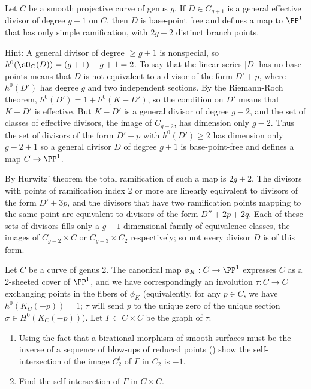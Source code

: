 \begin{exercise}[$g+1$ theorem]\label{g+1 theorem} 
Let $C$ be a smooth projective curve of genus $g$. If $D \in C_{g+1}$ is a general effective divisor of degree $g+1$ on $C$, then 
$D$ is base-point free and defines a  map to $\PP^1$ that has only simple ramification, with $2g+2$ distinct  branch points.

Hint: 
A general divisor of degree $\geq g+1$ is nonspecial, so $h^0(\sO_C(D)) = (g+1)-g+1 = 2$. To say that the linear series $|D|$ has no base points means that $D$ is not equivalent to a divisor of the form
$D'+p$, where $h^0(D')$ has degree $g$ and two independent sections. By the Riemann-Roch theorem, $h^0(D') = 1+h^0(K-D')$, so the condition on $D'$ means that $K-D'$ is effective. But $K-D'$ is a general divisor of degree $g-2$, and
the set of classes of effective divisors, the image of $C_{g-2}$, has dimension only $g-2$. 
Thus the set of divisors of the form $D'+p$ with $h^0(D') \geq 2$ has dimension only $g -2 +1$
so a general divisor $D$ of degree $g+1$ is base-point-free and defines a map $C\to \PP^1$. 

By Hurwitz' theorem the total ramification of such a map is $2g+2$. The divisors with points of ramification
index 2 or more are linearly equivalent to divisors of the form $D'+3p$, and the divisors that have two ramification
points mapping to the same point are equivalent to divisors of the form $D''+2p+2q$. Each of these sets
of divisors fills only a $g-1$-dimensional family of equivalence classes, the images of 
$C_{g-2}\times C$ or $C_{g-3}\times C_2$ respectively; so not every divisor $D$ is of this form.
\end{exercise}


\begin{exercise}\label{blow-up of $J(C)$ at a point}
Let $C$ be a curve of genus 2. The canonical map $\phi_K : C \to \PP^1$ expresses $C$ as a 2-sheeted cover of $\PP^1$, and we have correspondingly an involution $\tau : C \to C$ exchanging points in the fibers of $\phi_K$ (equivalently, for any $p \in C$, we have $h^0(K_C(-p)) = 1$; $\tau$ will send $p$ to the unique zero of the unique section $\sigma \in H^0(K_C(-p))$). Let $\Gamma \subset C \times C$ be the graph of $\tau$.
\begin{enumerate}
\item Using the fact that a birational morphism of smooth surfaces must be the inverse of a sequence of blow-ups of reduced points (\cite[V.??]{H}) show the self-intersection of the image $C^1_2$ of $\Gamma$ in $C_2$ is $-1$.
\item Find the self-intersection of $\Gamma$ in $C \times C$.
\end{enumerate}
\end{exercise}



